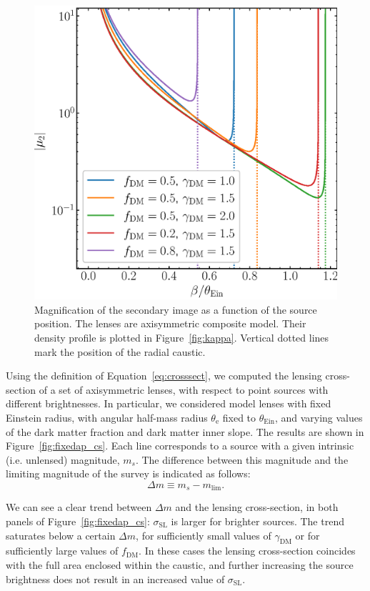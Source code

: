 \documentclass{aa}
\def\gammadm{\gamma_{\mathrm{DM}}}
\def\fdm{f_{\mathrm{DM}}}
\def\tein{\theta_{\mathrm{Ein}}}
\def\teff{\theta_{\mathrm{e}}}
\def\crosssect{\sigma_\mathrm{{SL}}}
\def\Fref#1{Figure~\ref{#1}\xspace}
\def\Eref#1{Equation~\ref{#1}\xspace}
\begin{document}
%
\begin{figure}
\includegraphics[width=\columnwidth]{composite_fixedap_mu2.eps}
\caption{
Magnification of the secondary image as a function of the source position.
The lenses are axisymmetric composite model. Their density profile is plotted in \Fref{fig:kappa}.
Vertical dotted lines mark the position of the radial caustic.
\label{fig:1dmag}
}
\end{figure}

Using the definition of \Eref{eq:crosssect}, we computed the lensing cross-section of a set of axisymmetric lenses, with respect to point sources with different brightnesses.
In particular, we considered model lenses with fixed Einstein radius, with angular half-mass radius $\teff$ fixed to $\tein$, and varying values of the dark matter fraction and dark matter inner slope.
The results are shown in \Fref{fig:fixedap_cs}.
Each line corresponds to a source with a given intrinsic (i.e. unlensed) magnitude, $m_s$. The difference between this magnitude and the limiting magnitude of the survey is indicated as follows:
\begin{equation}
\Delta m \equiv m_s - m_{\mathrm{lim}}.
\end{equation}

We can see a clear trend between $\Delta m$ and the lensing cross-section, in both panels of \Fref{fig:fixedap_cs}: $\crosssect$ is larger for brighter sources.
The trend saturates below a certain $\Delta m$, for sufficiently small values of $\gammadm$ or for sufficiently large values of $\fdm$.
In these cases the lensing cross-section coincides with the full area enclosed within the caustic, and further increasing the source brightness does not result in an increased value of $\crosssect$.
\end{document}
